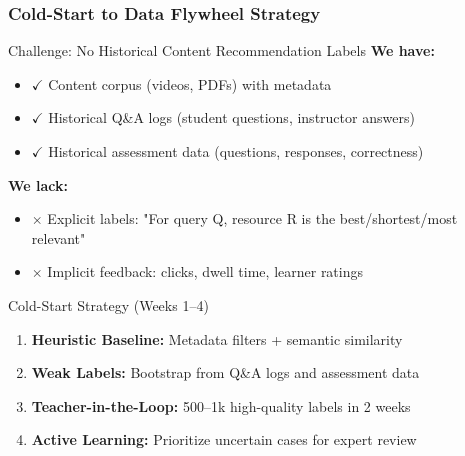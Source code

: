 \documentclass[aspectratio=169]{beamer}
\begin{document}
\begin{frame}
\frametitle{Cold-Start to Data Flywheel Strategy}
\begin{block}{Challenge: No Historical Content Recommendation Labels}
\textbf{We have:}
\begin{itemize}
\item $\checkmark$ Content corpus (videos, PDFs) with metadata
\item $\checkmark$ Historical Q\&A logs (student questions, instructor answers)
\item $\checkmark$ Historical assessment data (questions, responses, correctness)
\end{itemize}

\textbf{We lack:}
\begin{itemize}
\item $\times$ Explicit labels: "For query Q, resource R is the best/shortest/most relevant"
\item $\times$ Implicit feedback: clicks, dwell time, learner ratings
\end{itemize}
\end{block}

\begin{block}{Cold-Start Strategy (Weeks 1--4)}
\begin{enumerate}
\item \textbf{Heuristic Baseline:} Metadata filters + semantic similarity
\item \textbf{Weak Labels:} Bootstrap from Q\&A logs and assessment data
\item \textbf{Teacher-in-the-Loop:} 500--1k high-quality labels in 2 weeks
\item \textbf{Active Learning:} Prioritize uncertain cases for expert review
\end{enumerate}
\end{block}
\end{frame}
\end{document}
